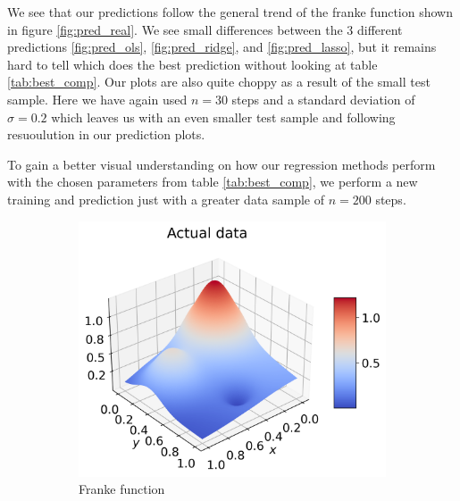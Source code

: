 \documentclass[12pt]{article}
\begin{document}
We see that our predictions follow the general trend of the franke function shown in figure \ref{fig:pred_real}. We see small differences between the 3 different predictions \ref{fig:pred_ols}, \ref{fig:pred_ridge}, and \ref{fig:pred_lasso}, but it remains hard to tell which does the best prediction without looking at table \ref{tab:best_comp}. Our plots are also quite choppy as a result of the small test sample. Here we have again used $n=30$ steps and a standard deviation of $\sigma=0.2$ which leaves us with an even smaller test sample and following resuoulution in our prediction plots.

To gain a better visual understanding on how our regression methods perform with the chosen parameters from table \ref{tab:best_comp}, we perform a new training and prediction just with a greater data sample of $n=200$ steps.
\begin{figure}[H]
  \begin{subfigure}{.5\textwidth}
    \centering
    \includegraphics[width=\textwidth]{../figures/actual_data_franke_extra.png}
    \caption{Franke function}
    \label{fig:extra_pred_real}
  \end{subfigure}
  \begin{subfigure}{.5\textwidth}
    \centering

\end{subfigure}
\end{figure}
\end{document}
